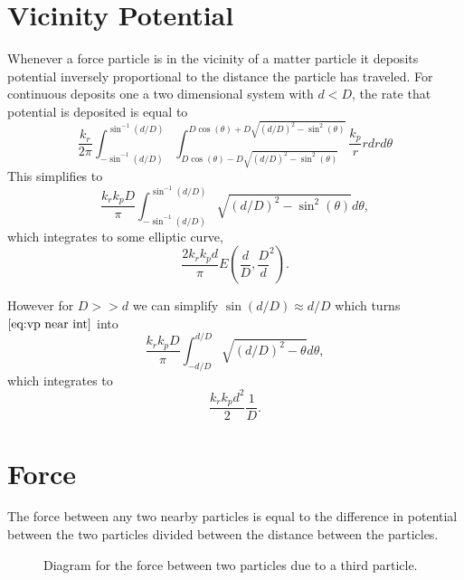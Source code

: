 \documentclass{article}
\begin{document}
\section{Vicinity Potential}
Whenever a force particle is in the vicinity of a matter particle it deposits potential inversely proportional to the distance the particle has traveled.
For continuous deposits one a two dimensional system with $d < D$, the rate that potential is deposited is equal to 
$$
\frac{k_r}{2\pi}
\int_{-\sin^{-1}(d/D)}^{\sin^{-1}(d/D)}
\int_{D \cos(\theta) - D\sqrt{(d/D)^2 - \sin^2(\theta)}}^{D \cos(\theta) + D\sqrt{(d/D)^2 - \sin^2(\theta)}}
\frac{k_p}{r} r dr d\theta
$$
This simplifies to
\begin{equation}
\frac{k_rk_pD}{\pi}
\int_{-\sin^{-1}(d/D)}^{\sin^{-1}(d/D)}
\sqrt{(d/D)^2 - \sin^2(\theta)}d\theta,
\label{eq:vp near int}
\end{equation}
which integrates to some elliptic curve, 
\begin{equation}
\frac{2k_rk_pd}{\pi} E\left(\frac{d}{D},\frac{D}{d}^2\right).
\label{eq:vp near}
\end{equation}

However for $D >> d$ we can simplify $\sin(d/D) \approx d/D$ which turns $\ref{eq:vp near int}$ into
$$
\frac{k_rk_pD}{\pi}
\int_{-d/D}^{d/D}
\sqrt{(d/D)^2 - \theta}d\theta,
$$
which integrates to
\begin{equation}
\frac{k_rk_pd^2}{2} \frac{1}{D}.
\label{eq:vp far}
\end{equation}

\section{Force}
The force between any two nearby particles is equal to the difference in potential between the two particles divided between the distance between the particles.

\begin{figure}[h!]
\centering
{}
\label{fig:force}
\caption{Diagram for the force between two particles due to a third particle.}
\end{figure}
\end{document}

